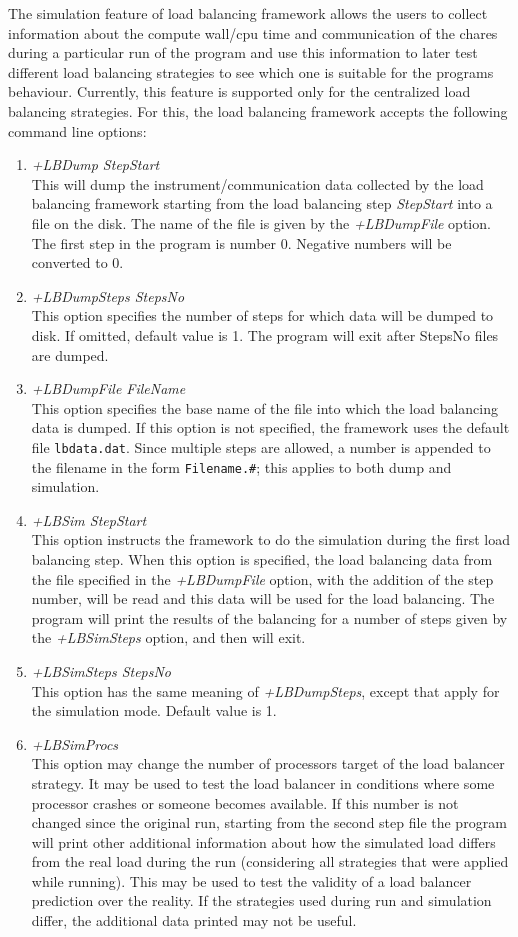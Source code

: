 The simulation feature of load balancing framework allows the users to collect information
about the compute wall/cpu time and communication of the chares during a particular run of
the program and use this information to later test different load balancing strategies to
see which one is suitable for the programs behaviour. Currently, this feature is supported only for
the centralized load balancing strategies. For this, the load balancing framework
accepts the following command line options:
\begin{enumerate}
\item {\em +LBDump StepStart}\\
        This will dump the instrument/communication data collected by the load balancing framework
	starting from the load balancing step {\em StepStart} into a file on the disk. The name of the file
	is given by the {\em +LBDumpFile} option. The first step in the program is number 0. Negative
	numbers will be converted to 0.
\item {\em +LBDumpSteps StepsNo}\\
        This option specifies the number of steps for which data will be dumped to disk. If omitted, default value is 1.
	The program will exit after StepsNo files are dumped.
\item {\em +LBDumpFile FileName}\\
	This option specifies the base name of the file into which the load balancing data is dumped. If this
	option is not specified, the framework uses the default file {\tt lbdata.dat}. Since multiple steps are allowed,
	a number is appended to the filename in the form {\tt Filename.\#}; this applies to both dump and
	simulation.
\item {\em +LBSim StepStart}\\
	This option instructs the framework to do the simulation during the first load balancing step.
	When this option is specified, the load balancing data from the file specified in the {\em +LBDumpFile}
	option, with the addition of the step number, will be read and this data
	will be used for the load balancing. The program will print the results
	of the balancing for a number of steps given by the {\em +LBSimSteps} option, and then will exit.
\item {\em +LBSimSteps StepsNo}\\
        This option has the same meaning of {\em +LBDumpSteps}, except that apply for the simulation mode.
	Default value is 1.
\item {\em +LBSimProcs}\\
        This option may change the number of processors target of the load balancer strategy. It may be used to test
	the load balancer in conditions where some processor crashes or someone becomes available. If this number is not
	changed since the original run, starting from the second step file the program will print other additional
	information about how the simulated load differs from the real load during the run (considering all
	strategies that were applied while running). This may be used to test the validity of a load balancer
	prediction over the reality. If the strategies used during run and simulation differ, the additional data
	printed may not be useful.
\end{enumerate}
